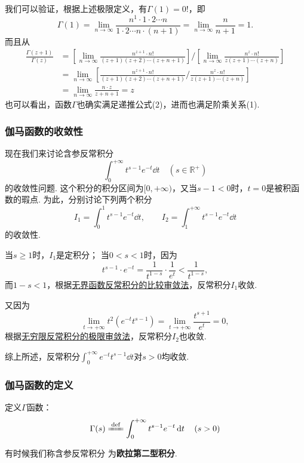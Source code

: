 我们可以验证，根据上述极限定义，有\(\Gamma(1) = 0!\)，即
\[
\Gamma(1)
= \lim\limits_{n\to\infty} \frac{n^1 \cdot 1 \cdot 2 \dotsm n}{1 \cdot 2 \dotsm n \cdot (n+1)}
= \lim\limits_{n\to\infty} \frac{n}{n+1}
= 1.
\]
而且从
\begin{align*}
\frac{\Gamma(z+1)}{\Gamma(z)}
&= \left[ \lim\limits_{n\to\infty} \frac{n^{z+1} \cdot n!}{(z+1)(z+2)\dotsm(z+n+1)} \right] \bigg/ \left[ \lim\limits_{n\to\infty} \frac{n^z \cdot n!}{z(z+1)\dotsm(z+n)} \right] \\
&= \lim\limits_{n\to\infty} \left[ \frac{n^{z+1} \cdot n!}{(z+1)(z+2)\dotsm(z+n+1)} \bigg/ \frac{n^z \cdot n!}{z(z+1)\dotsm(z+n)} \right] \\
&= \lim\limits_{n\to\infty} \frac{n \cdot z}{z+n+1}
= z
\end{align*}
也可以看出，函数\(\Gamma\)也确实满足递推公式(2)，进而也满足阶乘关系(1).

\subsubsection{伽马函数的收敛性}
现在我们来讨论含参反常积分\[
\int_0^{+\infty} t^{s-1} e^{-t} \dd{t} \quad(s\in\mathbb{R}^+)
\]的收敛性问题.
这个积分的积分区间为\([0,+\infty)\)，又当\(s-1<0\)时，\(t=0\)是被积函数的瑕点.
为此，分别讨论下列两个积分\[
I_1 = \int_0^1 t^{s-1} e^{-t} \dd{t},
\qquad
I_2 = \int_1^{+\infty} t^{s-1} e^{-t} \dd{t}
\]的收敛性.

当\(s \geqslant 1\)时，\(I_1\)是定积分；
当\(0 < s < 1\)时，因为\[
t^{s-1} \cdot e^{-t} = \frac{1}{t^{1-s}} \cdot \frac{1}{e^t} < \frac{1}{t^{1-s}},
\]而\(1-s < 1\)，根据\hyperref[theorem:定积分.无界函数的反常积分的比较审敛法]{无界函数反常积分的比较审敛法}，反常积分\(I_1\)收敛.

又因为\[
\lim\limits_{t\to+\infty} t^2 (e^{-t} t^{s-1})
= \lim\limits_{t\to+\infty} \frac{t^{s+1}}{e^t} = 0,
\]根据\hyperref[theorem:定积分.无穷限反常积分的极限审敛法]{无穷限反常积分的极限审敛法}，反常积分\(I_2\)也收敛.

综上所述，反常积分\(\int_0^{+\infty} e^{-t} t^{s-1} \dd{t}\)对\(s > 0\)均收敛.

\subsubsection{伽马函数的定义}
\begin{definition}
定义\(\Gamma\)函数：
\begin{equation}\label{equation:特殊函数.伽马函数的积分定义}
\Gamma(s)
\defeq
\int_0^{+\infty} t^{s-1} e^{-t} \dd{t}
\quad(s>0)
\end{equation}
\end{definition}
有时候我们称含参反常积分  为\textbf{欧拉第二型积分}.

